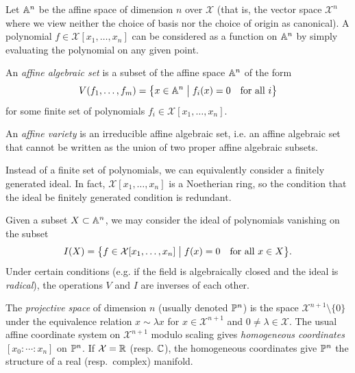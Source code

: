\documentclass[cclicense]{hmcthesis}
\newcommand*{\F}{\mathcal{X}}
\newcommand*{\vbar}{\;\big\vert\;}
\numberwithin{equation}{section}
\begin{document}
    Let $\mathbb{A}^n$ be the affine space of dimension $n$ over $\F$ (that is, the
    vector space $\F^n$ where we view neither the choice of basis nor the choice
    of origin as canonical).  A polynomial $f \in \F[x_1, \ldots, x_n]$ can be
    considered as a function on $\mathbb{A}^n$ by simply evaluating the polynomial on
    any given point.

    \begin{definition}
        An \emph{affine algebraic set} is a subset of the affine space $\mathbb{A}^n$
        of the form
        \[
            V(f_1, \ldots, f_m)
            = \cdel[\big]{x \in \A^n \vbar f_i(x) = 0 \quad\text{for all $i$}}
        \]
        for some finite set of polynomials $f_i \in \F[x_1, \ldots, x_n]$.

        An \emph{affine variety} is an irreducible affine algebraic set, i.e. an
        affine algebraic set that cannot be written as the union of two proper
        affine algebraic subsets.
    \end{definition}
    \noindent Instead of a finite set of polynomials, we can equivalently
    consider a finitely generated ideal.  In fact, $\F[x_1,\ldots,x_n]$ is a
    Noetherian ring, so the condition that the ideal be finitely generated
    condition is redundant.

    Given a subset $X \subset \mathbb{A}^n$, we may consider the ideal of polynomials
    vanishing on the subset
    \[
        I(X) = \cdel[\big]{f \in \F[x_1, \ldots, x_n] \vbar f(x) = 0 \quad\text{for
        all $x \in X$}}.
    \]
    Under certain conditions (e.g. if the field is algebraically closed and the
    ideal is \emph{radical}), the operations $V$ and $I$ are inverses of each other.

    \begin{definition}
        The \emph{projective space} of dimension $n$ (usually denoted $\mathbb{P}^n$)
        is the space $\F^{n+1}\setminus \{0\}$ under the equivalence relation $x
        \sim \lambda x$ for $x \in \F^{n+1}$ and $0 \ne \lambda \in \F$.  The
        usual affine coordinate system on $\F^{n+1}$ modulo scaling gives
        \emph{homogeneous coordinates} $[x_0: \cdots: x_n]$ on $\mathbb{P}^n$.  If
        $\F = \R$ (resp.  $\mathbb{C}$), the homogeneous coordinates give $\mathbb{P}^n$ the
        structure of a real (resp.\ complex) manifold.
    \end{definition}
\end{document}
